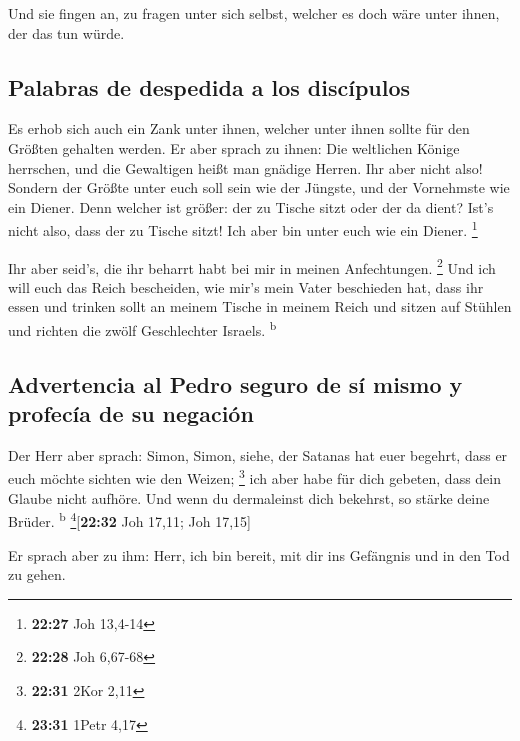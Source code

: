  Und sie fingen an, zu fragen unter sich selbst, welcher
es doch wäre unter ihnen, der das tun würde.

\hypertarget{palabras-de-despedida-a-los-discuxedpulos}{%
\subsection{Palabras de despedida a los
discípulos}\label{palabras-de-despedida-a-los-discuxedpulos}}

 Es erhob sich auch ein Zank unter ihnen, welcher unter
ihnen sollte für den Größten gehalten werden.  Er aber
sprach zu ihnen: Die weltlichen Könige herrschen, und die Gewaltigen
heißt man gnädige Herren.  Ihr aber nicht also! Sondern
der Größte unter euch soll sein wie der Jüngste, und der Vornehmste wie
ein Diener.  Denn welcher ist größer: der zu Tische sitzt
oder der da dient? Ist's nicht also, dass der zu Tische sitzt! Ich aber
bin unter euch wie ein Diener. \footnote{\textbf{22:27} Joh 13,4-14}

 Ihr aber seid's, die ihr beharrt habt bei mir in meinen
Anfechtungen. \footnote{\textbf{22:28} Joh 6,67-68}  Und
ich will euch das Reich bescheiden, wie mir's mein Vater beschieden hat,
 dass ihr essen und trinken sollt an meinem Tische in
meinem Reich und sitzen auf Stühlen und richten die zwölf Geschlechter
Israels. \textsuperscript{b}

\hypertarget{advertencia-al-pedro-seguro-de-suxed-mismo-y-profecuxeda-de-su-negaciuxf3n}{%
\subsection{Advertencia al Pedro seguro de sí mismo y profecía de su
negación}\label{advertencia-al-pedro-seguro-de-suxed-mismo-y-profecuxeda-de-su-negaciuxf3n}}

 Der Herr aber sprach: Simon, Simon, siehe, der Satanas
hat euer begehrt, dass er euch möchte sichten wie den Weizen;
\footnote{\textbf{22:31} 2Kor 2,11}  ich aber habe für
dich gebeten, dass dein Glaube nicht aufhöre. Und wenn du dermaleinst
dich bekehrst, so stärke deine Brüder. \textsuperscript{b}
\footnote{\textbf{23:31} 1Petr 4,17}{[}\textbf{22:32} Joh 17,11; Joh
17,15{]}

 Er sprach aber zu ihm: Herr, ich bin bereit, mit dir ins
Gefängnis und in den Tod zu gehen.

